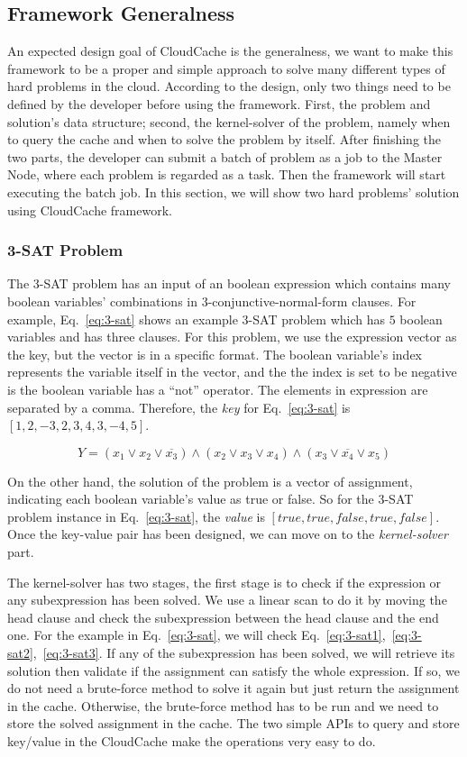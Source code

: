 \subsection{Framework Generalness}
An expected design goal of CloudCache is the generalness, we want to make this framework to be a proper and simple approach to solve many different types of hard problems in the cloud. According to the design, only two things need to be defined by the developer before using the framework. First, the problem and solution's data structure; second, the kernel-solver of the problem, namely when to query the cache and when to solve the problem by itself. After finishing the two parts, the developer can submit a batch of problem as a job to the Master Node, where each problem is regarded as a task. Then the framework will start executing the batch job. In this section, we will show two hard problems' solution using CloudCache framework.

\subsubsection{3-SAT Problem}
The 3-SAT problem has an input of an boolean expression which contains many boolean variables' combinations in 3-conjunctive-normal-form clauses. For example, Eq.~\ref{eq:3-sat} shows an example 3-SAT problem which has $5$ boolean variables and has three clauses. For this problem, we use the expression vector as the key, but the vector is in a specific format. The boolean variable's index represents the variable itself in the vector, and the the index is set to be negative is the boolean variable has a ``not'' operator. The elements in expression are separated by a comma. Therefore, the \emph{key} for Eq.~\ref{eq:3-sat} is $[1,2,-3,2,3,4,3,-4,5]$.

\begin{equation}
Y = (x_1 \vee x_2 \vee \overline{x_3}) \wedge (x_2 \vee x_3 \vee x_4) \wedge (x_3 \vee \overline{x_4} \vee x_5)
\label{eq:3-sat}
\end{equation}

On the other hand, the solution of the problem is a vector of assignment, indicating each boolean variable's value as true or false. So for the 3-SAT problem instance in Eq.~\ref{eq:3-sat}, the \emph{value} is $[true, true, false, true, false]$. Once the key-value pair has been designed, we can move on to the \emph{kernel-solver} part.

The kernel-solver has two stages, the first stage is to check if the expression or any subexpression has been solved. We use a linear scan to do it by moving the head clause and check the subexpression between the head clause and the end one. For the example in Eq.~\ref{eq:3-sat}, we will check Eq.~\ref{eq:3-sat1},~\ref{eq:3-sat2},~\ref{eq:3-sat3}. If any of the subexpression has been solved, we will retrieve its solution then validate if the assignment can satisfy the whole expression. If so, we do not need a brute-force method to solve it again but just return the assignment in the cache. Otherwise, the brute-force method has to be run and we need to store the solved assignment in the cache. The two simple APIs to query and store key/value in the CloudCache make the operations very easy to do.

